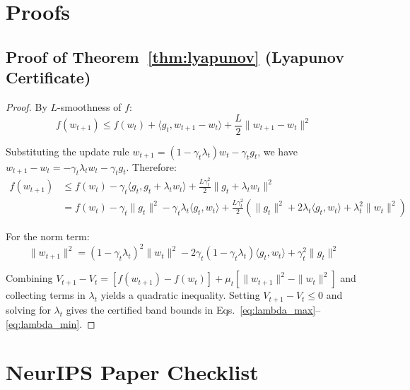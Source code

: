 \documentclass{article}
\begin{document}



\appendix
\section{Proofs}
\label{app:proofs}

\subsection{Proof of Theorem~\ref{thm:lyapunov} (Lyapunov Certificate)}

\begin{proof}
By $L$-smoothness of $f$:
\begin{equation}
f(w_{t+1}) \leq f(w_t) + \langle g_t, w_{t+1} - w_t \rangle + \frac{L}{2}\|w_{t+1} - w_t\|^2
\end{equation}

Substituting the update rule $w_{t+1} = (1 - \gamma_t\lambda_t)w_t - \gamma_t g_t$, we have $w_{t+1} - w_t = -\gamma_t\lambda_t w_t - \gamma_t g_t$. Therefore:
\begin{align}
f(w_{t+1}) &\leq f(w_t) - \gamma_t\langle g_t, g_t + \lambda_t w_t\rangle + \frac{L\gamma_t^2}{2}\|g_t + \lambda_t w_t\|^2 \\
&= f(w_t) - \gamma_t\|g_t\|^2 - \gamma_t\lambda_t\langle g_t, w_t\rangle + \frac{L\gamma_t^2}{2}(\|g_t\|^2 + 2\lambda_t\langle g_t, w_t\rangle + \lambda_t^2\|w_t\|^2)
\end{align}

For the norm term:
\begin{equation}
\|w_{t+1}\|^2 = (1-\gamma_t\lambda_t)^2\|w_t\|^2 - 2\gamma_t(1-\gamma_t\lambda_t)\langle g_t, w_t\rangle + \gamma_t^2\|g_t\|^2
\end{equation}

Combining $V_{t+1} - V_t = [f(w_{t+1}) - f(w_t)] + \mu_t[\|w_{t+1}\|^2 - \|w_t\|^2]$ and collecting terms in $\lambda_t$ yields a quadratic inequality. Setting $V_{t+1} - V_t \leq 0$ and solving for $\lambda_t$ gives the certified band bounds in Eqs.~\eqref{eq:lambda_max}--\eqref{eq:lambda_min}.
\end{proof}

\newpage
\section*{NeurIPS Paper Checklist}
\end{document}
